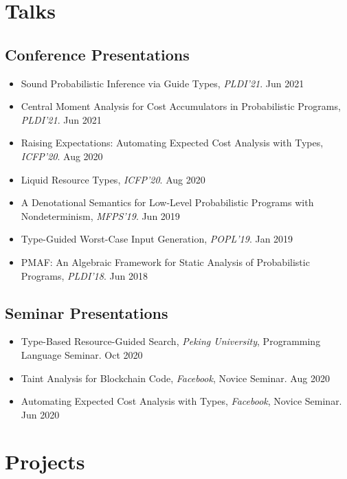 \documentclass[11pt,letterpaper,roman]{moderncv}        %
\begin{document}
\section{Talks}

\subsection{Conference Presentations}

\begin{itemize}
  \item {Sound Probabilistic Inference via Guide Types}, \emph{PLDI'21}. \hfill Jun 2021
  \item {Central Moment Analysis for Cost Accumulators in Probabilistic Programs}, \emph{PLDI'21}. \hfill Jun 2021
  \item {Raising Expectations: Automating Expected Cost Analysis with Types}, \emph{ICFP'20}. \hfill Aug 2020
  \item {Liquid Resource Types}, \emph{ICFP'20}. \hfill Aug 2020
  \item {A Denotational Semantics for Low-Level Probabilistic Programs with Nondeterminism}, \emph{MFPS'19}. \hfill Jun 2019
  \item {Type-Guided Worst-Case Input Generation}, \emph{POPL'19}. \hfill Jan 2019
  \item {PMAF: An Algebraic Framework for Static Analysis of Probabilistic Programs}, \emph{PLDI'18}. \hfill Jun 2018
\end{itemize}

\subsection{Seminar Presentations}

\begin{itemize}
  \item {Type-Based Resource-Guided Search}, \emph{Peking University}, Programming Language Seminar. \hfill Oct 2020
  \item {Taint Analysis for Blockchain Code}, \emph{Facebook}, Novice Seminar. \hfill Aug 2020
  \item {Automating Expected Cost Analysis with Types}, \emph{Facebook}, Novice Seminar. \hfill Jun 2020
\end{itemize}

\section{Projects}
\end{document}
